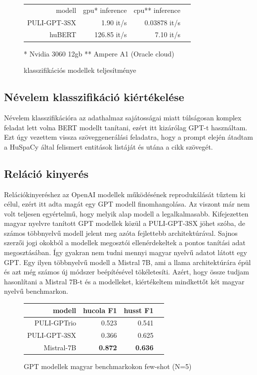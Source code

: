 \begin{figure}[H]
	\centering
	\begin{tabular}{rrrr}
		modell & gpu* inference & cpu** inference \\
		PULI-GPT-3SX & 1.90 it/s & 0.03878 it/s \\
		huBERT & 126.85 it/s & 7.10 it/s \\
	\end{tabular}
	\caption{klasszifikációs modellek teljesítménye}{
		* Nvidia 3060 12gb
		** Ampere A1 (Oracle cloud)}
\end{figure}

\subsection{Névelem klasszifikáció kiértékelése}

Névelem klasszifikációra az adathalmaz sajátosságai miatt túlságosan komplex feladat lett volna BERT modellt tanítani, ezért itt kizárólag GPT-t használtam. Ezt úgy vezettem vissza szöveggenerálási feladatra, hogy a prompt elején átadtam a HuSpaCy által felismert entitások listáját és utána a cikk szövegét.

\subsection{Reláció kinyerés}

Relációkinyeréshez az OpenAI modellek működésének reprodukálását tűztem ki célul, ezért itt adta magát egy GPT modell finomhangolása. Az viszont már nem volt teljesen egyértelmű, hogy melyik alap modell a legalkalmasabb. Kifejezetten magyar nyelvre tanított GPT modellek közül a PULI-GPT-3SX jöhet szóba, de számos többnyelvű modell jelent meg azóta fejlettebb architektúrával. Sajnos szerzői jogi okokból a modellek megosztói ellenérdekeltek a pontos tanítási adat megosztásában. Így gyakran nem tudni mennyi magyar nyelvű adatot látott egy GPT. Egy ilyen többnyelvű modell a Mistral 7B, ami a llama architektúrára épül és azt még számos új módszer beépítésével tökéletesíti. Azért, hogy össze tudjam hasonlítani a Mistral 7B-t és a modelleket, kiértékeltem mindkettőt két magyar nyelvű benchmarkon.

\begin{figure}[H]
	\centering
	\begin{tabular}{rrrr}
		modell & hucola F1 & husst F1 \\ \hline
		PULI-GPTrio & 0.523 & 0.541 \\
		PULI-GPT-3SX & 0.366 & 0.625 \\
		Mistral-7B & \textbf{0.872} & \textbf{0.636} \\
	\end{tabular}
	\caption{GPT modellek magyar benchmarkokon few-shot (N=5)}
\end{figure}


